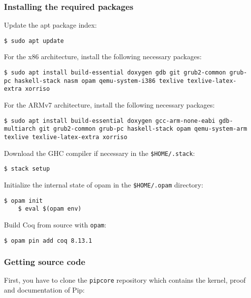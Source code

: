 \documentclass[10pt,a4paper,titlepage]{refart}
\begin{document}
\subsubsection{Installing the required packages}

Update the apt package index:

\begin{lstlisting}[style=BashStyle]
    $ sudo apt update
\end{lstlisting}

For the x86 architecture, install the following necessary packages:

\begin{lstlisting}[style=BashStyle]
    $ sudo apt install build-essential doxygen gdb git grub2-common grub-pc haskell-stack nasm opam qemu-system-i386 texlive texlive-latex-extra xorriso
\end{lstlisting}

For the ARMv7 architecture, install the following necessary packages:

\begin{lstlisting}[style=BashStyle]
    $ sudo apt install build-essential doxygen gcc-arm-none-eabi gdb-multiarch git grub2-common grub-pc haskell-stack opam qemu-system-arm texlive texlive-latex-extra xorriso
\end{lstlisting}

Download the GHC compiler if necessary in the \texttt{\$HOME/.stack}:

\begin{lstlisting}[style=BashStyle]
    $ stack setup
\end{lstlisting}

Initialize the internal state of opam in the \texttt{\$HOME/.opam} directory:

\begin{lstlisting}[style=BashStyle]
    $ opam init
    $ eval $(opam env)
\end{lstlisting}

Build Coq from source with \texttt{opam}:

\begin{lstlisting}[style=BashStyle]
    $ opam pin add coq 8.13.1
\end{lstlisting}

\subsubsection{Getting source code}

First, you have to clone the \texttt{pipcore} repository which contains the
kernel, proof and documentation of Pip:
\end{document}
